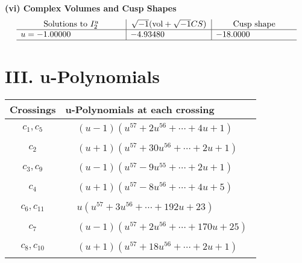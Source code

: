 \documentclass[1p]{elsarticle_modified}
\theoremstyle{definition}
\newcommand{\I}{\sqrt{-1}}
\begin{document}
\newpage\flushleft \textbf{(vi) Complex Volumes and Cusp Shapes}
$$\begin{array}{c|c|c}  
\text{Solutions to }I^u_{2}& \I (\text{vol} + \sqrt{-1}CS) & \text{Cusp shape}\\
 \hline 
\begin{aligned}
u &= -1.00000\phantom{ +0.000000I}\end{aligned}
 & -4.93480\phantom{ +0.000000I} & -18.0000\phantom{ +0.000000I}\\
 \hline 
 \end{array}$$\newpage
\newpage\renewcommand{\arraystretch}{1}
\centering \section*{ III. u-Polynomials}
\begin{tabular}{m{50pt}|m{274pt}}
Crossings & \hspace{64pt}u-Polynomials at each crossing \\
\hline $$\begin{aligned}c_{1},c_{5}\end{aligned}$$&$\begin{aligned}
&(u-1)(u^{57}+2 u^{56}+\cdots+4 u+1)
\end{aligned}$\\
\hline $$\begin{aligned}c_{2}\end{aligned}$$&$\begin{aligned}
&(u+1)(u^{57}+30 u^{56}+\cdots+2 u+1)
\end{aligned}$\\
\hline $$\begin{aligned}c_{3},c_{9}\end{aligned}$$&$\begin{aligned}
&(u-1)(u^{57}-9 u^{55}+\cdots+2 u+1)
\end{aligned}$\\
\hline $$\begin{aligned}c_{4}\end{aligned}$$&$\begin{aligned}
&(u+1)(u^{57}-8 u^{56}+\cdots+4 u+5)
\end{aligned}$\\
\hline $$\begin{aligned}c_{6},c_{11}\end{aligned}$$&$\begin{aligned}
&u(u^{57}+3 u^{56}+\cdots+192 u+23)
\end{aligned}$\\
\hline $$\begin{aligned}c_{7}\end{aligned}$$&$\begin{aligned}
&(u-1)(u^{57}+2 u^{56}+\cdots+170 u+25)
\end{aligned}$\\
\hline $$\begin{aligned}c_{8},c_{10}\end{aligned}$$&$\begin{aligned}
&(u+1)(u^{57}+18 u^{56}+\cdots+2 u+1)
\end{aligned}$\\
\hline
\end{tabular}\newpage\renewcommand{\arraystretch}{1}
\end{document}
